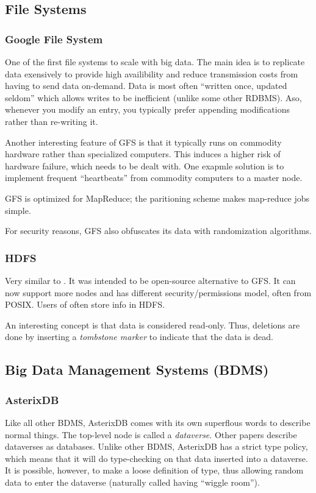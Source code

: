 \subsection{File Systems}
\subsubsection{Google File System}\label{sec:GFS}
One of the first file systems to scale with big data. The main idea is to replicate data
exensively to provide high availibility and reduce transmission costs from having to send data on-demand.
Data is most often ``written once, updated seldom'' which allows writes to be inefficient (unlike some other RDBMS). Aso, whenever you modify an entry, you typically prefer appending modifications rather than re-writing it.

Another interesting feature of GFS is that it typically runs on commodity hardware rather than
specialized computers. This induces a higher risk of hardware failure, which needs to be dealt with.
One exapmle solution is to implement frequent ``heartbeats'' from commodity computers to a master node.

GFS is optimized for MapReduce; the paritioning scheme makes map-reduce jobs simple.

For security reasons, GFS also obfuscates its data with randomization algorithms.

\subsubsection{HDFS}\label{sec:HDFS}
Very similar to . It was intended to be open-source alternative to GFS.\@
It can now support more nodes and has different security/permissions model, often from POSIX.
Users of  often store info in HDFS.

An interesting concept is that data is considered read-only. Thus, deletions are
done by inserting a \textit{tombstone marker} to indicate that the data is dead.

\subsection{Big Data Management Systems (BDMS)}
\subsubsection{AsterixDB}\label{sec:asterixdb}
Like all other BDMS, AsterixDB comes with its own superflous words to describe
normal things. The top-level node is called a \textit{dataverse}. Other papers describe
dataverses as databases. Unlike other BDMS, AsterixDB has a strict type policy,
which means that it will do type-checking on that data inserted into a dataverse.
It is possible, however, to make a loose definition of type, thus allowing random data
to enter the dataverse (naturally called having ``wiggle room'').

